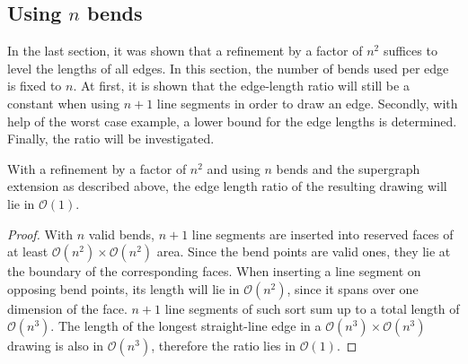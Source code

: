 \subsection{Using $n$ bends}

In the last section, it was shown that a refinement by a factor of $n^2$ suffices to level the lengths of all edges. In this section, the number of bends used per edge is fixed to $n$. At first, it is shown that the edge-length ratio will still be a constant when using $n+1$ line segments in order to draw an edge. Secondly, with help of the worst case example, a lower bound for the edge lengths is determined. Finally, the ratio will be investigated.
\begin{lemma}
\end{lemma}
With a refinement by a factor of $n^2$ and using $n$ bends and the supergraph extension as described above, the edge length ratio of the resulting drawing will lie in $\mathcal{O}(1)$.
\begin{proof}
	With $n$ valid bends, $n+1$ line segments are inserted into reserved faces of at least $\mathcal{O}(n^2)\times \mathcal{O}(n^2)$ area. Since the bend points are valid ones, they lie at the boundary of the corresponding faces. When inserting a line segment on opposing bend points, its length will lie in $\mathcal{O}(n^2)$, since it spans over one dimension of the face. $n+1$ line segments of such sort sum up to a total length of $\mathcal{O}(n^3)$. The length of the longest straight-line edge in a $\mathcal{O}(n^3)\times\mathcal{O}(n^3)$ drawing is also in $\mathcal{O}(n^3)$, therefore the ratio lies in $\mathcal{O}(1)$.
\end{proof}

